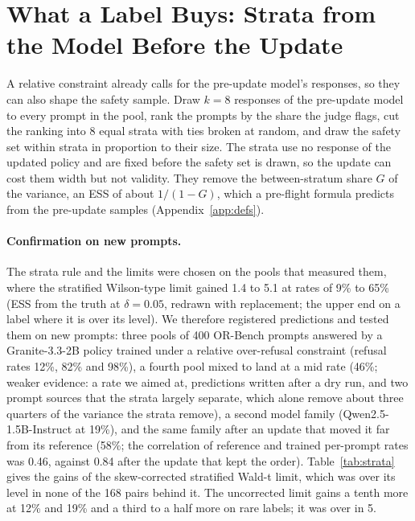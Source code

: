 \documentclass[letterpaper]{article} %
\newcommand{\SWT}{stratified Wald-t limit}
\newcommand{\SWL}{stratified Wilson-type limit}
\begin{document}
\section{What a Label Buys: Strata from the Model Before the Update}
\label{sec:strata}

A relative constraint already calls for the pre-update model's responses, so they can also shape the safety sample. Draw
$k=8$ responses of the pre-update model to every prompt in the pool, rank the prompts by the share the judge flags, cut
the ranking into 8 equal strata with ties broken at random, and draw the safety set within strata in proportion to their
size. The strata use no response of the updated policy and are fixed before the safety set is drawn, so the update can
cost them width but not validity. They remove the between-stratum share $G$ of the variance, an ESS of about $1/(1-G)$,
which a pre-flight formula predicts from the pre-update samples (Appendix~\ref{app:defs}).

\paragraph{Confirmation on new prompts.} The strata rule and the limits were chosen on the pools that measured them,
where the \SWL{} gained 1.4 to 5.1 at rates of 9\% to 65\% (ESS from the truth at $\delta=0.05$, redrawn with replacement; the upper end
on a label where it is over its level). We therefore registered predictions and tested them on new prompts: three pools of
400 OR-Bench prompts \citep{cui2025orbench} answered by a Granite-3.3-2B policy trained under a relative over-refusal
constraint (refusal rates 12\%, 82\% and 98\%), a fourth pool mixed to land at a mid rate (46\%; weaker evidence: a rate we aimed at, predictions written after a dry
run, and two prompt sources that the strata largely separate, which alone remove about three quarters of the variance
the strata remove), a second model family
(Qwen2.5-1.5B-Instruct at 19\%), and the same family after an update that moved it far from its reference (58\%; the
correlation of reference and trained per-prompt rates was 0.46, against 0.84 after the update that kept the order).
Table~\ref{tab:strata} gives the gains of the skew-corrected \SWT{}, which was over its level in none of the 168 pairs behind it. The uncorrected limit gains a tenth more at 12\% and 19\% and a third to a half more on rare labels; it was over in 5.
\end{document}

